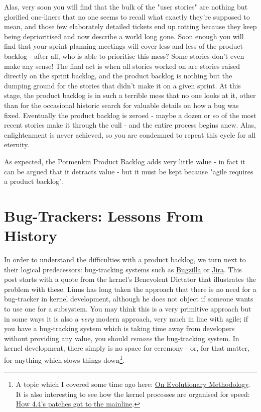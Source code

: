 \documentclass{book}
\begin{document}
Alas, very soon you will find that the bulk of the "user stories" are
nothing but glorified one-liners that no one seems to recall what
exactly they're supposed to mean, and those few elaborately detailed
tickets end up rotting because they keep being deprioritised and now
describe a world long gone. Soon enough you will find that your sprint
planning meetings will cover less and less of the product backlog -
after all, who is able to prioritise this mess?  Some stories don't
even make any sense! The final act is when all stories worked on are
stories raised directly on the sprint backlog, and the product backlog
is nothing but the dumping ground for the stories that didn't make it
on a given sprint. At this stage, the product backlog is in such a
terrible mess that no one looks at it, other than for the occasional
historic search for valuable details on how a bug was
fixed. Eventually the product backlog is zeroed - maybe a dozen or so
of the most recent stories make it through the cull - and the entire
process begins anew. Alas, enlightenment is never achieved, so you are
condemned to repeat this cycle for all eternity.

As expected, the Potmenkin Product Backlog adds very little value - in
fact it can be argued that it detracts value - but it must be kept
because "agile requires a product backlog".

\section*{Bug-Trackers: Lessons From History}
\label{sec-3}

In order to understand the difficulties with a product backlog, we
turn next to their logical predecessors: bug-tracking systems such as
\href{https://www.bugzilla.org/}{Bugzilla} or \href{https://www.atlassian.com/software/jira}{Jira}. This post starts with a quote from the kernel's
Benevolent Dictator that illustrates the problem with these. Linus has
long taken the approach that there is no need for a bug-tracker in
kernel development, although he does not object if someone wants to
use one for a subsystem. You may think this is a very primitive
approach but in some ways it is also a \emph{very} modern approach, very
much in line with agile; if you have a bug-tracking system which is
taking time away from developers without providing any value, you
should \emph{remove} the bug-tracking system. In kernel development, there
simply is no space for ceremony - or, for that matter, for anything
which slows things down\footnote{A topic which I covered some time ago here: \href{http://mcraveiro.blogspot.co.uk/2008/06/nerd-food-on-evolutionary-methodology.html}{On
Evolutionary Methodology}. It is also interesting to see how the kernel
processes are organised for speed: \href{http://lwn.net/Articles/670209/}{How 4.4's patches got to the
mainline}.}.
\end{document}
